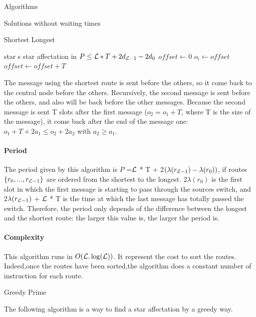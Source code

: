 \documentclass[a4paper,10pt]{report}
\begin{document}
\begin{chapter}{Algorithms}
\begin{section}{Solutions without waiting times}
\begin{subsection}{Shortest Longest}
\begin{algorithm}[H]
\caption{Star affectation from shortest to longest}
\begin{algorithmic}

\REQUIRE star s
\ENSURE star affectation in $P \le {\cal L}*T + 2d_{{\cal L}-1} - 2d_0$
\STATE $offset \leftarrow 0$
\STATE $o_i \leftarrow offset$
\STATE $offset \leftarrow offset+T$
\ENDFOR

\end{algorithmic}
\end{algorithm}


The message using the shortest route is sent before the others, so it come back to the central node before the others.
Recursively, the second message is sent before the others, and also will be back before the other messages. 
Because the second message is sent T slots after the first message ($o_2 = o_1 + T$, where T is the size of the message), it come back after
the end of the message one: $o_1+ T + 2a_1 \le o_2 + 2a_2$ with $a_2 \ge a_1$.

\paragraph{Period}
The period given by this algorithm is $P$ =${\cal L}$ * T + 2$(\lambda(r_{{\cal L}-1}) - \lambda(r_0))$, if routes $\{r_0,...,r_{{\cal L}-1}\}$ are ordered
from the shortest to the longest. 2$\lambda(r_0)$ is the first slot in which the first message is starting to pass through the sources switch,
and 2$\lambda(r_{{\cal L}-1})$ + ${\cal L}$ * T  is the time at which the last message has totally passed the switch.
Therefore, the period only depends of the difference between the longest and the shortest route: the larger this value is, the larger
the period is.

\paragraph{Complexity}
This algorithm runs in $O({\cal L}.\log({\cal L}))$. It represent the cost to sort the routes.
Indeed,once the routes have been sorted,the algorithm does a constant number of instruction for each route.
\end{subsection}

\begin{subsection}{Greedy Prime}

The following algorithm is a way to find a star affectation by a greedy way.


\end{subsection}
\end{section}
\end{chapter}
\end{document}
